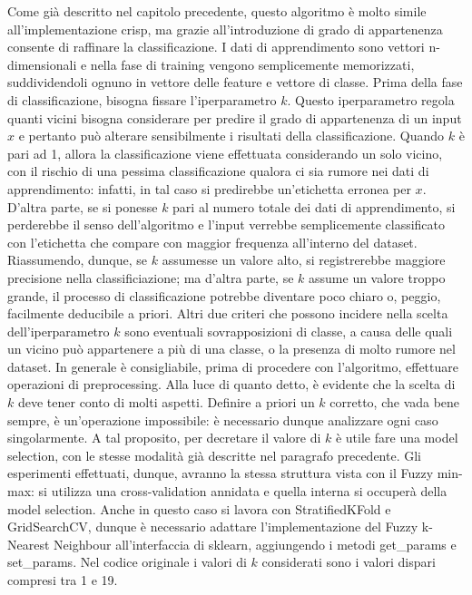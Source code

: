 \documentclass[11pt,  oneside, openany]{book}
\begin{document}
Come già descritto nel capitolo precedente, questo algoritmo è molto simile all'implementazione crisp, ma grazie all'introduzione di grado di appartenenza consente di raffinare la classificazione. I dati di apprendimento sono vettori n-dimensionali e nella fase di training vengono semplicemente memorizzati, suddividendoli ognuno in vettore delle feature e vettore di classe. Prima della fase di classificazione, bisogna fissare l'iperparametro $k$. Questo iperparametro regola quanti vicini bisogna considerare per predire il grado di appartenenza di un input $x$ e pertanto può alterare sensibilmente i risultati della classificazione. Quando $k$ è pari ad 1, allora la classificazione viene effettuata considerando un solo vicino, con il rischio di una pessima classificazione qualora ci sia rumore nei dati di apprendimento: infatti, in tal caso si predirebbe un'etichetta erronea per $x$. D'altra parte, se si ponesse $k$ pari al numero totale dei dati di apprendimento, si perderebbe il senso dell'algoritmo e l'input verrebbe semplicemente classificato con l'etichetta che compare con maggior frequenza all'interno del dataset. Riassumendo, dunque, se $k$ assumesse un valore alto, si registrerebbe maggiore precisione nella classificiazione; ma d'altra parte, se $k$ assume un valore troppo grande, il processo di classificazione potrebbe diventare poco chiaro o, peggio, facilmente deducibile a priori. Altri due criteri che possono incidere nella scelta dell'iperparametro $k$  sono eventuali sovrapposizioni di classe, a causa delle quali un vicino può appartenere a più di una classe, o la presenza di molto rumore nel dataset. In generale è consigliabile, prima di procedere con l'algoritmo, effettuare operazioni di preprocessing. Alla luce di quanto detto, è evidente che la scelta di $k$ deve tener conto di molti aspetti. Definire a priori un $k$ corretto, che vada bene sempre, è un'operazione impossibile: è necessario dunque analizzare ogni caso singolarmente. A tal proposito, per decretare il valore di $k$ è utile fare una model selection, con le stesse modalità già descritte nel paragrafo precedente. Gli esperimenti effettuati, dunque, avranno la stessa struttura vista con il Fuzzy min-max: si utilizza una cross-validation annidata e quella interna si occuperà della model selection. Anche in questo caso si lavora con StratifiedKFold e GridSearchCV, dunque è necessario adattare l'implementazione del Fuzzy k-Nearest Neighbour all'interfaccia di sklearn, aggiungendo i metodi get\_params e set\_params. Nel codice originale i valori di $k$ considerati sono i valori dispari compresi tra 1 e 19. 
\end{document}
